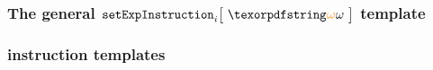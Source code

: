 \subsubsection{The general $\setExpInstruction {i}{\relof}$ template}                  \label{hub: misc: exp: general}     

\subsubsection{\expMod{} instruction templates}
   \label{hub: misc: exp: exp log}     
   \label{hub: misc: exp: modexp log}  
